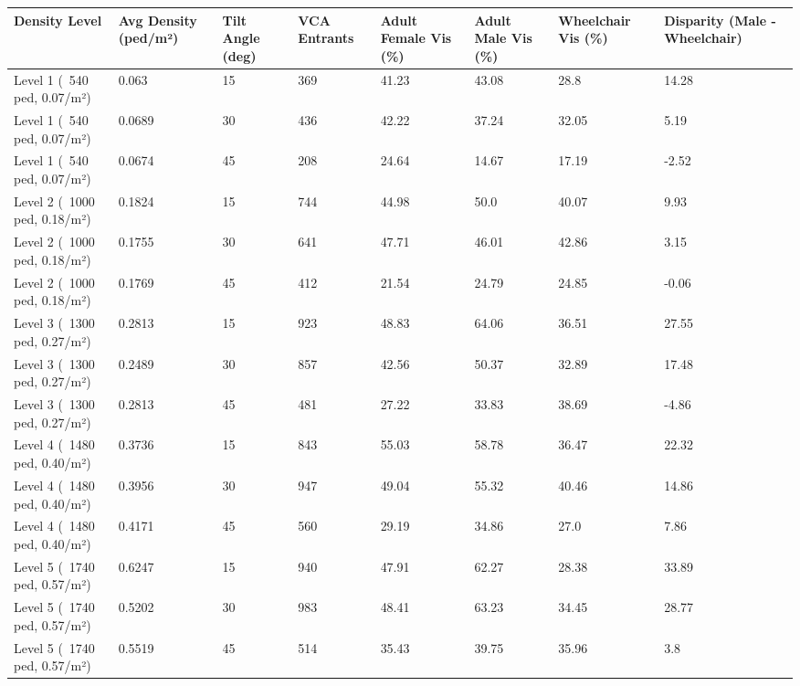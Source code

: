\begin{tabular}{llllllll}
\hline
Density Level & Avg Density (ped/m²) & Tilt Angle (deg) & VCA Entrants & Adult Female Vis (\%) & Adult Male Vis (\%) & Wheelchair Vis (\%) & Disparity (Male - Wheelchair) \\ \hline
Level 1 (~540 ped, 0.07/m²) & 0.063 & 15 & 369 & 41.23 & 43.08 & 28.8 & 14.28 \\
Level 1 (~540 ped, 0.07/m²) & 0.0689 & 30 & 436 & 42.22 & 37.24 & 32.05 & 5.19 \\
Level 1 (~540 ped, 0.07/m²) & 0.0674 & 45 & 208 & 24.64 & 14.67 & 17.19 & -2.52 \\
Level 2 (~1000 ped, 0.18/m²) & 0.1824 & 15 & 744 & 44.98 & 50.0 & 40.07 & 9.93 \\
Level 2 (~1000 ped, 0.18/m²) & 0.1755 & 30 & 641 & 47.71 & 46.01 & 42.86 & 3.15 \\
Level 2 (~1000 ped, 0.18/m²) & 0.1769 & 45 & 412 & 21.54 & 24.79 & 24.85 & -0.06 \\
Level 3 (~1300 ped, 0.27/m²) & 0.2813 & 15 & 923 & 48.83 & 64.06 & 36.51 & 27.55 \\
Level 3 (~1300 ped, 0.27/m²) & 0.2489 & 30 & 857 & 42.56 & 50.37 & 32.89 & 17.48 \\
Level 3 (~1300 ped, 0.27/m²) & 0.2813 & 45 & 481 & 27.22 & 33.83 & 38.69 & -4.86 \\
Level 4 (~1480 ped, 0.40/m²) & 0.3736 & 15 & 843 & 55.03 & 58.78 & 36.47 & 22.32 \\
Level 4 (~1480 ped, 0.40/m²) & 0.3956 & 30 & 947 & 49.04 & 55.32 & 40.46 & 14.86 \\
Level 4 (~1480 ped, 0.40/m²) & 0.4171 & 45 & 560 & 29.19 & 34.86 & 27.0 & 7.86 \\
Level 5 (~1740 ped, 0.57/m²) & 0.6247 & 15 & 940 & 47.91 & 62.27 & 28.38 & 33.89 \\
Level 5 (~1740 ped, 0.57/m²) & 0.5202 & 30 & 983 & 48.41 & 63.23 & 34.45 & 28.77 \\
Level 5 (~1740 ped, 0.57/m²) & 0.5519 & 45 & 514 & 35.43 & 39.75 & 35.96 & 3.8 \\
\hline
\end{tabular}
